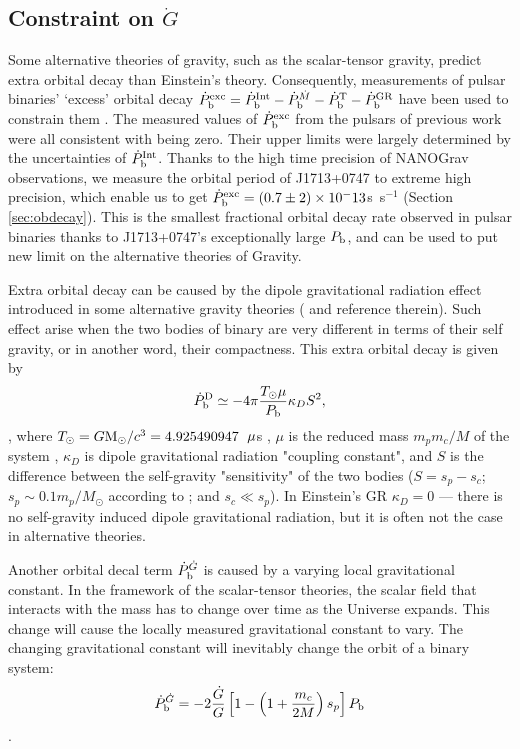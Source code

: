 \subsection{Constraint on $\dot{G}$}
\label{sec:Gdot}
Some alternative theories of gravity, such as the scalar-tensor gravity, predict extra orbital decay than Einstein's theory. 
Consequently, measurements of pulsar binaries' `excess' orbital decay
$\dot{P}_{\rm b}^{\rm exc}=\dot{P}_{\rm b}^{\rm Int} - \dot{P}_{\rm
b}^{\dot{M}}  - \dot{P}_{\rm b}^{\rm T} - \dot{P}_{\rm b}^{\rm GR}$ have been
used to constrain them \citep{lwj+09, fwe+12}. 
The measured values of $\dot{P}_{\rm b}^{\rm exc}$ from the pulsars of
previous work were all consistent with being zero. Their upper limits were largely determined by the uncertainties of $\dot{P}_{\rm b}^{\rm Int}$.
Thanks to the high time precision of NANOGrav observations, we measure the
orbital period of J1713+0747 to extreme high precision, which enable us to 
get $\dot{P}_{\rm b}^{\rm exc}=(0.7\pm2)\times10^-13$s~s$^{-1}$ (Section
\ref{sec:obdecay}). 
This is the smallest fractional orbital decay rate observed in pulsar binaries
thanks to J1713+0747's exceptionally large $P_{\rm b}$, and can be used to put new limit on
the alternative theories of Gravity.

Extra orbital decay can be caused by the dipole gravitational radiation effect
introduced in some alternative gravity theories (\citealt{Will93, Will01, lwj+09, fwe+12} and reference therein). Such effect arise when the two bodies of binary are very different in terms of their self gravity, or in another word, their compactness.
This extra orbital decay is given by 
\begin{equation}
\dot{P}_{\rm b}^{\rm D} \simeq -4\pi\frac{T_{\odot}\mu}{P_{\rm b}}\kappa_D S^2,
\end{equation}
\citep{lwj+09}, where $T_{\odot}=G{\rm M_{\odot}}/c^3=4.925490947$~${\rm
\mu}$s \citep{lk05}, $\mu$ is the reduced mass $m_pm_c/M$ of the system , $\kappa_D $ is dipole
gravitational radiation "coupling constant", and $S$ is the difference
between the self-gravity "sensitivity" of the two bodies ($S = s_p - s_c$;
$s_p\sim0.1m_p/M_{\odot}$ according to \citealt{de92} ; and $s_c\ll s_p$).
In Einstein's GR $\kappa_D=0$ --- there is no self-gravity induced
dipole gravitational radiation, but it is often not the case in alternative
theories.

Another orbital decal term $\dot{P}_{\rm b}^{\dot{G}}$ is caused by a varying
local gravitational constant. In the framework of the scalar-tensor theories,
the scalar field that interacts with the mass has to change over time as the
Universe expands. This change will cause the locally measured gravitational
constant to vary. The changing gravitational constant will inevitably change
the orbit of a binary system:
\begin{equation}
\dot{P}_{\rm b}^{\dot{G}} = -2 \frac{\dot{G}}{G}
\left[1-\left(1+\frac{m_c}{2M}\right)s_p\right]P_{\rm b}
\end{equation}
\citep{dgt88,nor90}.

